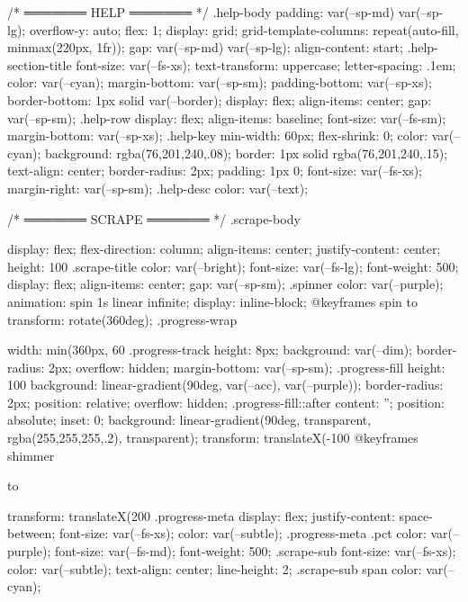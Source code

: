 {{{{{/* ═══════ HELP ═══════ */
.help-body {
  padding: var(--sp-md) var(--sp-lg); overflow-y: auto; flex: 1;
  display: grid; grid-template-columns: repeat(auto-fill, minmax(220px, 1fr));
  gap: var(--sp-md) var(--sp-lg); align-content: start;
}
.help-section-title {
  font-size: var(--fs-xs); text-transform: uppercase; letter-spacing: .1em; color: var(--cyan);
  margin-bottom: var(--sp-sm); padding-bottom: var(--sp-xs); border-bottom: 1px solid var(--border);
  display: flex; align-items: center; gap: var(--sp-sm);
}
.help-row { display: flex; align-items: baseline; font-size: var(--fs-sm); margin-bottom: var(--sp-xs); }
.help-key {
  min-width: 60px; flex-shrink: 0; color: var(--cyan);
  background: rgba(76,201,240,.08); border: 1px solid rgba(76,201,240,.15);
  text-align: center; border-radius: 2px; padding: 1px 0; font-size: var(--fs-xs); margin-right: var(--sp-sm);
}
.help-desc { color: var(--text); }

/* ═══════ SCRAPE ═══════ */
.scrape-body { display: flex; flex-direction: column; align-items: center; justify-content: center; height: 100%
.scrape-title { color: var(--bright); font-size: var(--fs-lg); font-weight: 500; display: flex; align-items: center; gap: var(--sp-sm); }
.spinner { color: var(--purple); animation: spin 1s linear infinite; display: inline-block; }
@keyframes spin { to { transform: rotate(360deg); } }
.progress-wrap { width: min(360px, 60%
.progress-track { height: 8px; background: var(--dim); border-radius: 2px; overflow: hidden; margin-bottom: var(--sp-sm); }
.progress-fill {
  height: 100%
  background: linear-gradient(90deg, var(--acc), var(--purple)); border-radius: 2px;
  position: relative; overflow: hidden;
}
.progress-fill::after {
  content: ''; position: absolute; inset: 0;
  background: linear-gradient(90deg, transparent, rgba(255,255,255,.2), transparent);
  transform: translateX(-100%
}
@keyframes shimmer { to { transform: translateX(200%
.progress-meta { display: flex; justify-content: space-between; font-size: var(--fs-xs); color: var(--subtle); }
.progress-meta .pct { color: var(--purple); font-size: var(--fs-md); font-weight: 500; }
.scrape-sub { font-size: var(--fs-xs); color: var(--subtle); text-align: center; line-height: 2; }
.scrape-sub span { color: var(--cyan); }

}}}}}}}}}
